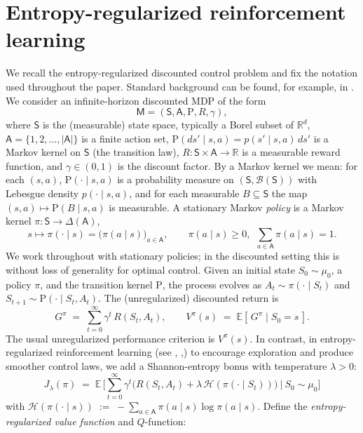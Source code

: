 \documentclass{article}
\theoremstyle{definition}
\theoremstyle{remark}
\theoremstyle{plain}
\newcommand{\MKQ}{\mathrm{P}}
\numberwithin{equation}{section}
\begin{document}
\section{Entropy-regularized reinforcement learning}
\label{sec:setup}
We recall the entropy-regularized discounted control problem and fix the notation used throughout the paper. Standard background can be found, for example, in 
\cite{foster2023foundations}.
We consider an infinite-horizon discounted MDP of the form 
\[
\mathsf{M} = (\mathsf{S}, \mathsf{A}, \MKQ, R, \gamma),
\]
where $\mathsf{S}$ is the (measurable) state space, typically a Borel subset of    
$\mathbb{R}^d$, 
 $\mathsf{A}=\{1,2,\ldots,|\mathsf{A}|\}$ is a finite action set,
$\MKQ(ds' \mid s,a)=p(s' \mid s,a)\,ds'$ is a Markov kernel on $\mathsf{S}$ (the transition law),
$R:\mathsf{S}\times\mathsf{A}\to\mathbb{R}$ is a measurable reward function, 
and $\gamma\in(0,1)$ is the discount factor. 
By a Markov kernel we mean: for each $(s,a)$, $\MKQ(\cdot\mid s,a)$ is a probability measure on $(\mathsf{S},\mathcal{B}(\mathsf{S}))$ with Lebesgue density $p(\cdot\mid s,a)$, and for each measurable $B\subseteq\mathsf{S}$ the map $(s,a)\mapsto \MKQ(B\mid s,a)$ is measurable.
A stationary Markov \emph{policy} is a Markov kernel $\pi:\mathsf{S}\to\Delta(\mathsf{A})$,
\[
s \longmapsto \pi(\cdot\mid s)=\big(\pi(a\mid s)\big)_{a\in\mathsf{A}},
\qquad 
\pi(a\mid s)\ge 0,\ \ \sum_{a\in\mathsf{A}}\pi(a\mid s)=1.
\]
We work throughout with stationary policies; in the discounted setting this is without loss of generality for optimal control.
Given an initial state $S_0\sim \mu_0$, a policy $\pi$, and the transition kernel $\MKQ$,
the process evolves as $A_t\sim \pi(\cdot\mid S_t)$ and $S_{t+1}\sim \MKQ(\cdot\mid S_t,A_t)$.
The (unregularized) discounted return is
\[
G^\pi \;=\; \sum_{t=0}^{\infty}\gamma^t\, R(S_t,A_t),
\qquad 
V^\pi(s)\;=\; \mathbb{E}\!\left[\,G^\pi\mid S_0=s\,\right].
\]
The usual unregularized performance criterion is $V^\pi(s)$. In contrast, in entropy-regularized reinforcement learning (see \cite{neu2017unifiedviewentropyregularizedmarkov}, \cite{pmlr-v97-geist19a},\cite{Mei2019}) to encourage exploration and produce smoother control laws, we add a Shannon-entropy bonus with temperature $\lambda>0$:
\[
J_\lambda(\pi) \;=\; 
\mathbb{E}\,\Bigg[\sum_{t=0}^\infty \gamma^t \Big(R(S_t,A_t) + \lambda\,\mathcal{H}(\pi(\cdot\mid S_t))\Big) \ \Big | \ S_0\sim\mu_0\Bigg]
\]
with \(\mathcal{H}(\pi(\cdot\mid s)) \;:=\; -\sum_{a\in\mathsf{A}}\pi(a\mid s)\log\pi(a\mid s).\)
Define the \emph{entropy-regularized value function} and $Q$-function:
\end{document}
